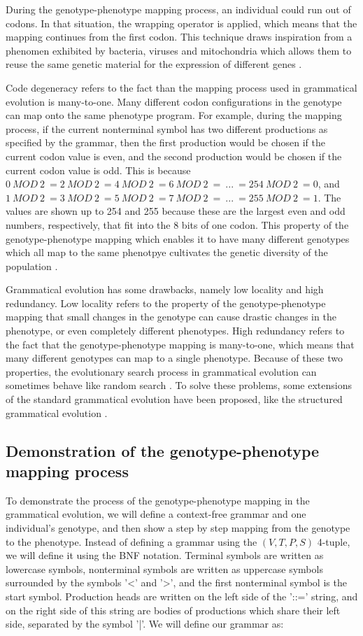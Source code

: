 During the genotype-phenotype mapping process, an individual could run out of codons. In that situation, the wrapping operator is applied, which means that the mapping continues from the first codon. This technique draws inspiration from a phenomen exhibited by bacteria, viruses and mitochondria which allows them to reuse the same genetic material for the expression of different genes \citep{neill2003grammaticalevolution}.

Code degeneracy refers to the fact than the mapping process used in grammatical evolution is many-to-one. Many different codon configurations in the genotype can map onto the same phenotype program. For example, during the mapping process, if the current nonterminal symbol has two different productions as specified by the grammar, then the first production would be chosen if the current codon value is even, and the second production would be chosen if the current codon value is odd. This is because $0\:MOD\:2\:=2\:MOD\:2\:=4\:MOD\:2\:=6\:MOD\:2\:=\:...\:=254\:MOD\:2\:=0$, and $1\:MOD\:2\:=3\:MOD\:2\:=5\:MOD\:2\:=7\:MOD\:2\:=\:...\:=255\:MOD\:2\:=1$. The values are shown up to 254 and 255 because these are the largest even and odd numbers, respectively, that fit into the 8 bits of one codon. This property of the genotype-phenotype mapping which enables it to have many different genotypes which all map to the same phenotpye cultivates the genetic diversity of the population \citep{neill2003grammaticalevolution}.

Grammatical evolution has some drawbacks, namely low locality and high redundancy. Low locality refers to the property of the genotype-phenotype mapping that small changes in the genotype can cause drastic changes in the phenotype, or even completely different phenotypes. High redundancy refers to the fact that the genotype-phenotype mapping is many-to-one, which means that many different genotypes can map to a single phenotype. Because of these two properties, the evolutionary search process in grammatical evolution can sometimes behave like random search \citep{megane2022coevolutionary}. To solve these problems, some extensions of the standard grammatical evolution have been proposed, like the structured grammatical evolution \citep{lourenco2018structured}.

\subsection{Demonstration of the genotype-phenotype mapping process}
To demonstrate the process of the genotype-phenotype mapping in the grammatical evolution, we will define a context-free grammar and one individual's genotype, and then show a step by step mapping from the genotype to the phenotype. Instead of defining a grammar using the $(V, T, P, S)$ 4-tuple, we will define it using the BNF notation. Terminal symbols are written as lowercase symbols, nonterminal symbols are written as uppercase symbols surrounded by the symbols '<' and '>', and the first nonterminal symbol is the start symbol. Production heads are written on the left side of the '::=' string, and on the right side of this string are bodies of productions which share their left side, separated by the symbol '|'. We will define our grammar as:

